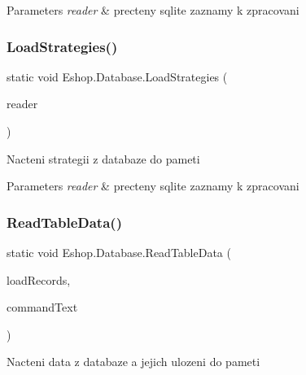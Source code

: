 \begin{DoxyParams}{Parameters}
{\em reader} & precteny sqlite zaznamy k zpracovani\\
\hline
\end{DoxyParams}
\mbox{\label{class_eshop_1_1_database_af63f03aac766810014723c21d8798e35}} 
\subsubsection{\texorpdfstring{LoadStrategies()}{LoadStrategies()}}
{\footnotesize\ttfamily static void Eshop.\+Database.\+Load\+Strategies (\begin{DoxyParamCaption}\item[{S\+Q\+Lite\+Data\+Reader}]{reader }\end{DoxyParamCaption})\hspace{0.3cm}{\ttfamily [static]}}



Nacteni strategii z databaze do pameti 


\begin{DoxyParams}{Parameters}
{\em reader} & precteny sqlite zaznamy k zpracovani\\
\hline
\end{DoxyParams}
\mbox{\label{class_eshop_1_1_database_a9cff1ffe604cabea07eec4b807d0e1c2}} 
\subsubsection{\texorpdfstring{ReadTableData()}{ReadTableData()}}
{\footnotesize\ttfamily static void Eshop.\+Database.\+Read\+Table\+Data (\begin{DoxyParamCaption}\item[{Action$<$ S\+Q\+Lite\+Data\+Reader $>$}]{load\+Records,  }\item[{string}]{command\+Text }\end{DoxyParamCaption})\hspace{0.3cm}{\ttfamily [static]}}



Nacteni data z databaze a jejich ulozeni do pameti 


